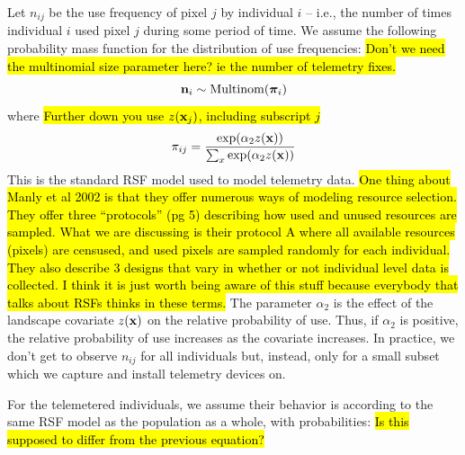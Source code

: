 Let $n_{ij}$ be the use frequency of pixel $j$ by individual $i$ --
i.e.,
the number of times individual $i$ used pixel $j$
during some period of time.  We assume the
following probability mass function for the distribution of use
frequencies:
\hl{Don't we need the multinomial size parameter here? ie the number
  of telemetry fixes.}
\[
{\bf n}_{i} \sim \mbox{Multinom}({\bm \pi}_{i})
\]
where
\hl{Further down you use $z({\bf x}_j)$, including subscript $j$}
\[
 \pi_{ij} = \frac{ \exp( \alpha_{2} z({\bf x}) ) }{ \sum_{x}
   \exp(\alpha_{2} z({\bf x}))}
\]
This is the standard RSF model \citep{manly_etal:2002} used to model
telemetry data.
\hl{One thing about Manly et al 2002 is that they offer
  numerous ways of modeling resource selection. They offer three
  ``protocols'' (pg 5) describing how used and unused resources are
  sampled. What we are discussing is their protocol A where all
  available resources (pixels) are censused, and used pixels are
  sampled randomly for each individual. They also describe 3 designs
  that vary in whether or not individual level data is collected. I
  think it is just worth being aware of this stuff because everybody
  that talks about RSFs thinks in these terms.}
The parameter $\alpha_2$ is the effect of the
landscape covariate $z({\bf x})$ on the relative probability of
use. Thus, if $\alpha_2$ is positive, the relative probability of use
increases as the covariate increases. In practice, we don't get to
observe $n_{ij}$ for all individuals but, instead, only for a small
subset which we capture and install telemetry devices on.

For the telemetered individuals, we assume their behavior is according
to the same RSF model as the population as a whole, with
probabilities:
\hl{Is this supposed to differ from the previous equation?}
